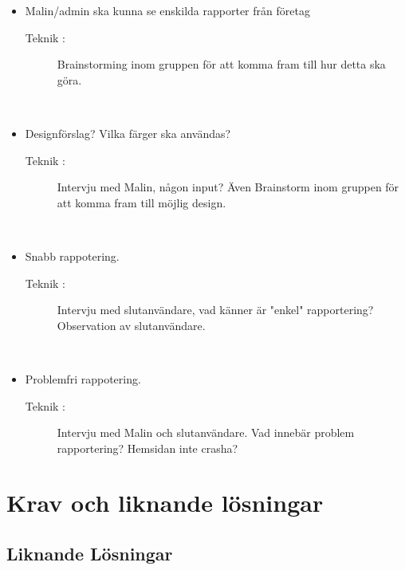 \documentclass[12pt]{article}
\begin{document}
\begin{itemize}
             \item Malin/admin ska kunna se enskilda rapporter från företag
                    \begin{description}
                        \item[Teknik :]Brainstorming inom gruppen för att komma fram till hur detta ska göra.
                    \end{description}
                \\
                \item Designförslag? Vilka färger ska användas?
                    \begin{description}
                        \item[Teknik :] Intervju med Malin, någon input? Även Brainstorm inom gruppen för att komma fram till möjlig design.
                    \end{description}
                \\
                 \item Snabb rappotering.
                    \begin{description}
                        \item[Teknik :] Intervju med slutanvändare, vad känner är "enkel" rapportering? Observation av slutanvändare.
                    \end{description}
                 \\
                 \item Problemfri rappotering.
                    \begin{description}
                        \item[Teknik :]Intervju med Malin och slutanvändare. Vad innebär problem rapportering? Hemsidan inte crasha? 
                    \end{description}
                    
                
                
                
                
            \end{itemize}
        
    \newpage
    
\section{Krav och liknande lösningar}
    \subsection{Liknande Lösningar}
\end{document}
